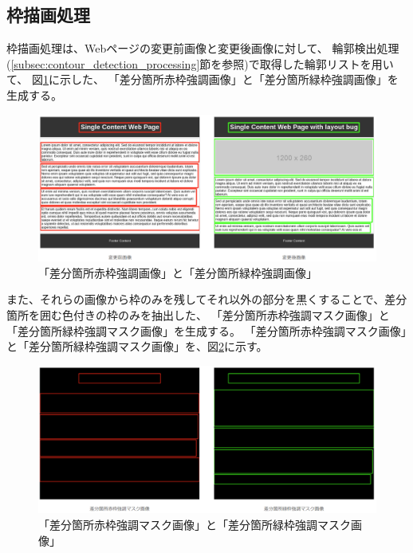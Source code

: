 \subsection{枠描画処理}\label{subsec:Bounding box drawing process}
枠描画処理は、Webページの変更前画像と変更後画像に対して、
輪郭検出処理(\ref{subsec:contour_detection_processing}節を参照)で取得した輪郭リストを用いて、
図\ref{fig: img_diff_highlight}に示した、
「差分箇所赤枠強調画像」と「差分箇所緑枠強調画像」を生成する。
\begin{figure}[tp]
    \begin{center}
        \includegraphics[width=1.0\columnwidth]{image/4_img_diff_highlight.png}
        \caption{「差分箇所赤枠強調画像」と「差分箇所緑枠強調画像」}
        \label{fig: img_diff_highlight}
    \end{center}
\end{figure}
また、それらの画像から枠のみを残してそれ以外の部分を黒くすることで、差分箇所を囲む色付きの枠のみを抽出した、
「差分箇所赤枠強調マスク画像」と「差分箇所緑枠強調マスク画像」を生成する。
「差分箇所赤枠強調マスク画像」と「差分箇所緑枠強調マスク画像」を、図\ref{fig: img_diff_highlight_mask}に示す。
\begin{figure}[tp]
    \begin{center}
        \includegraphics[width=1.0\columnwidth]{image/4_img_diff_highlight_mask.png}
        \caption{「差分箇所赤枠強調マスク画像」と「差分箇所緑枠強調マスク画像」}
        \label{fig: img_diff_highlight_mask}
    \end{center}
\end{figure}
